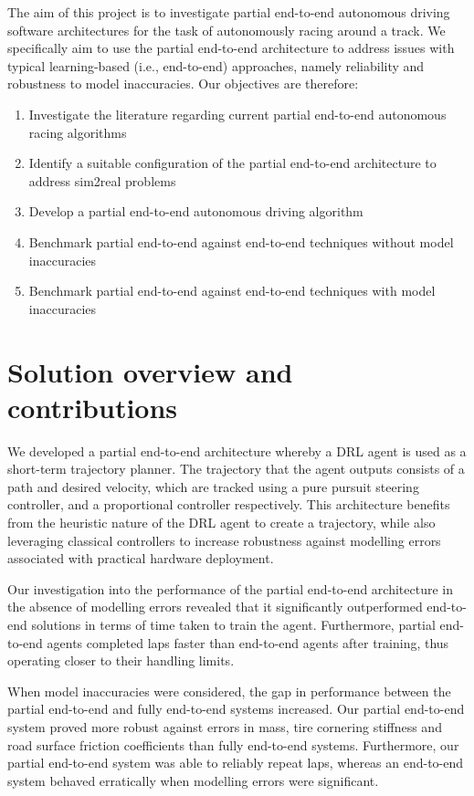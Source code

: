 The aim of this project is to investigate partial end-to-end autonomous driving software architectures for the task of autonomously racing around a track. 
We specifically aim to use the partial end-to-end architecture to address issues with typical learning-based (i.e., end-to-end) approaches, namely reliability and robustness to model inaccuracies. Our objectives are therefore:
\begin{enumerate}
    \item Investigate the literature regarding current partial end-to-end autonomous racing algorithms
    \item Identify a suitable configuration of the partial end-to-end architecture to address sim2real problems
    \item Develop a partial end-to-end autonomous driving algorithm
    \item Benchmark partial end-to-end against end-to-end techniques without model inaccuracies
    \item Benchmark partial end-to-end against end-to-end techniques with model inaccuracies
\end{enumerate}

\section{Solution overview and contributions}

We developed a partial end-to-end architecture whereby a DRL agent is used as a short-term trajectory planner.
The trajectory that the agent outputs consists of a path and desired velocity, which are tracked using a pure pursuit steering controller, and a proportional controller respectively.
This architecture benefits from the heuristic nature of the DRL agent to create a trajectory, while also leveraging classical controllers to increase robustness against modelling errors associated with practical hardware deployment.

Our investigation into the performance of the partial end-to-end architecture in the absence of modelling errors revealed that it significantly outperformed end-to-end solutions in terms of time taken to train the agent.
Furthermore, partial end-to-end agents completed laps faster than end-to-end agents after training, thus operating closer to their handling limits.

When model inaccuracies were considered, the gap in performance between the partial end-to-end and fully end-to-end systems increased.
Our partial end-to-end system proved more robust against errors in mass, tire cornering stiffness and road surface friction coefficients than fully end-to-end systems.
Furthermore, our partial end-to-end system was able to reliably repeat laps, whereas an end-to-end system behaved erratically when modelling errors were significant.


